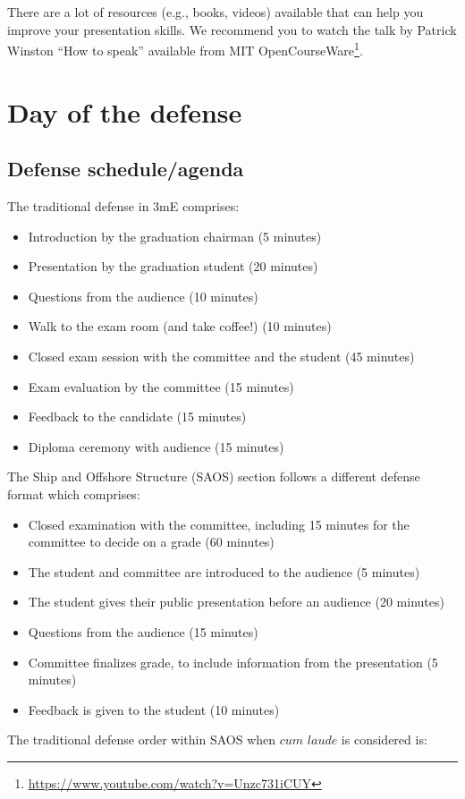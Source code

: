 \documentclass{article}
\begin{document}
There are a lot of resources (e.g., books, videos) available that can help you improve your presentation skills. We recommend you to watch the talk by Patrick Winston “How to speak” available from MIT OpenCourseWare\footnote{\url{https://www.youtube.com/watch?v=Unzc731iCUY}}.

\section{Day of the defense}
\subsection{Defense schedule/agenda}
The traditional defense in 3mE comprises:
\begin{itemize}
    \item Introduction by the graduation chairman (5 minutes)
    \item Presentation by the graduation student (20 minutes)
    \item Questions from the audience (10 minutes)
    \item Walk to the exam room (and take coffee!) (10 minutes)
    \item Closed exam session with the committee and the student (45 minutes)
    \item Exam evaluation by the committee (15 minutes)
    \item Feedback to the candidate (15 minutes)
    \item Diploma ceremony with audience (15 minutes)
\end{itemize}
The Ship and Offshore Structure (SAOS) section follows a different defense format which comprises:
\begin{itemize}
    \item Closed examination with the committee, including 15 minutes for the committee to decide on a grade (60 minutes)
    \item The student and committee are introduced to the audience (5 minutes)
    \item The student gives their public presentation before an audience (20 minutes)
    \item Questions from the audience (15 minutes)
    \item Committee finalizes grade, to include information from the presentation (5 minutes)
    \item Feedback is given to the student (10 minutes)
\end{itemize}
The traditional defense order within SAOS when $cum$ $laude$ is considered is:
\end{document}
